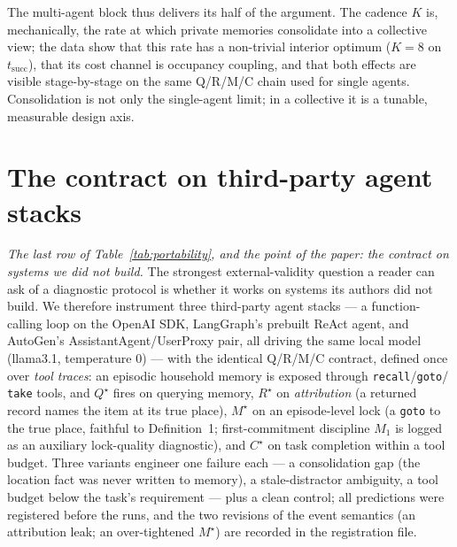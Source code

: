 \documentclass{article}
\newcommand{\method}[1]{\texttt{#1}}
\begin{document}
The multi-agent block thus delivers its half of the argument. The
cadence $K$ is, mechanically, the rate at which private memories
consolidate into a collective view; the data show that this rate has a
non-trivial interior optimum ($K\!=\!8$ on $t_{\mathrm{succ}}$), that
its cost channel is occupancy coupling, and that both effects are
visible stage-by-stage on the same Q/R/M/C chain used for single
agents. Consolidation is not only the single-agent limit; in a
collective it is a tunable, measurable design axis.

\section{The contract on third-party agent stacks}
\label{sec:external}

\emph{The last row of Table~\ref{tab:portability}, and the point of
the paper: the contract on systems we did not build.}
The strongest external-validity question a reader can ask of a
diagnostic protocol is whether it works on systems its authors did not
build. We therefore instrument three third-party agent stacks --- a
function-calling loop on the OpenAI SDK, LangGraph's prebuilt ReAct
agent, and AutoGen's AssistantAgent/UserProxy pair, all driving the
same local model (llama3.1, temperature $0$) --- with the identical
Q/R/M/C contract, defined once over \emph{tool traces}: an episodic
household memory is exposed through \method{recall}/\method{goto}/%
\method{take} tools, and $Q^\star$ fires on querying memory, $R^\star$
on \emph{attribution} (a returned record names the item at its true
place), $M^\star$ on an episode-level lock (a \method{goto} to the
true place, faithful to Definition~1; first-commitment discipline
$M_1$ is logged as an auxiliary lock-quality diagnostic), and
$C^\star$ on task completion within a tool budget. Three variants
engineer one failure each --- a consolidation gap (the location fact
was never written to memory), a stale-distractor ambiguity, a tool
budget below the task's requirement --- plus a clean control; all
predictions were registered before the runs, and the two revisions of
the event semantics (an attribution leak; an over-tightened $M^\star$)
are recorded in the registration file.
\end{document}
